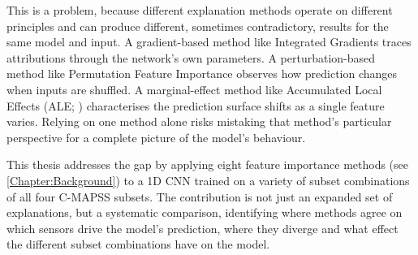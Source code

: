 This is a problem, because different explanation methods operate on different principles and can produce different, sometimes contradictory, results for the same model and input. A gradient-based method like Integrated Gradients \citep{sundararajan2017axiomaticattributiondeepnetworks} traces attributions through the network's own parameters. A perturbation-based method like Permutation Feature Importance \citep{BreimanRandomForest} observes how prediction changes when inputs are shuffled. A marginal-effect method like Accumulated Local Effects (ALE; \cite{apley2020ale}) characterises the prediction surface shifts as a single feature varies. Relying on one method alone risks mistaking that method's particular perspective for a complete picture of the model's behaviour.

This thesis addresses the gap by applying eight feature importance methods (see \ref{Chapter:Background}) to a 1D CNN trained on a variety of subset combinations of all four C-MAPSS subsets. The contribution is not just an expanded set of explanations, but a systematic comparison, identifying where methods agree on which sensors drive the model's prediction, where they diverge and what effect the different subset combinations have on the model.
